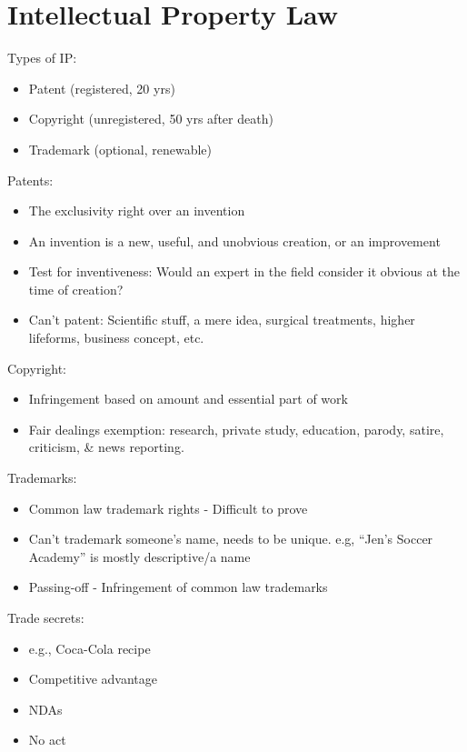 \documentclass[
  letterpaper,
  landscape,
  columns=3,
  draft,
]{cheatsheet}
\begin{document}
  \section{Intellectual Property Law}
  Types of IP:
  \begin{itemize}
    \item Patent (registered, 20 yrs)
    \item Copyright (unregistered, 50 yrs after death)
    \item Trademark (optional, renewable)
  \end{itemize}
  Patents:
  \begin{itemize}
    \item The exclusivity right over an invention
    \item An invention is a new, useful, and unobvious creation, or an improvement
    \item Test for inventiveness: Would an expert in the field consider it obvious at the time of creation?
    \item Can't patent: Scientific stuff, a mere idea, surgical treatments, higher lifeforms, business concept, etc.
  \end{itemize}
  Copyright:
  \begin{itemize}
    \item Infringement based on amount and essential part of work
    \item Fair dealings exemption: research, private study, education, parody, satire, criticism, \& news reporting.
  \end{itemize}
  Trademarks:
  \begin{itemize}
    \item Common law trademark rights - Difficult to prove
    \item Can't trademark someone's name, needs to be unique. e.g, ``Jen's Soccer Academy'' is mostly descriptive/a name
    \item Passing-off - Infringement of common law trademarks
  \end{itemize}
  Trade secrets:
  \begin{itemize}
    \item e.g., Coca-Cola recipe
    \item Competitive advantage
    \item NDAs
    \item No act
  \end{itemize}
\end{document}
